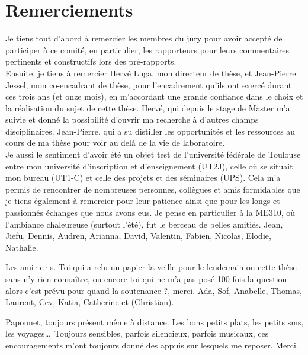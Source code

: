 
\thispagestyle{empty}
\section*{Remerciements}
\adjustmtc

Je tiens tout d'abord à remercier les membres du jury pour avoir accepté de 
participer à ce comité, en particulier, les rapporteurs pour leurs commentaires 
pertinents et constructifs lors des pré-rapports.
\\

Ensuite, je tiens à remercier Hervé Luga, mon directeur de thèse, et Jean-Pierre 
Jessel, mon co-encadrant de thèse, pour l'encadrement qu'ils ont exercé durant 
ces trois ans (et onze mois), en m'accordant une grande confiance dans le choix 
et la réalisation du sujet de cette thèse. 
Hervé, qui depuis le stage de Master m'a suivie et donné la possibilité d'ouvrir 
ma recherche à d'autres champs disciplinaires. Jean-Pierre, qui a su distiller 
les opportunités et les ressources au cours de ma thèse pour voir au delà de la vie 
de laboratoire.
\\

Je aussi le sentiment d'avoir été un objet test de l'université fédérale de Toulouse 
entre mon 
université d'inscription et d'enseignement (UT2J), celle où se situait mon bureau 
(UT1-C) et celle des projets et des séminaires (UPS). Cela m'a permis de 
rencontrer de nombreuses personnes, collègues et amis formidables que je tiens 
également à remercier pour leur patience ainsi que pour les longs et passionnés 
échanges que nous avons eus. Je pense en particulier à la ME310, où l'ambiance 
chaleureuse 
(surtout l'été), fut le berceau de belles amitiés. {\color{white} Jean, Jiefu, 
Dennis, Audren, Arianna, David, Valentin, Fabien, Nicolas, Elodie, Nathalie.}

Les ami·e·s. Toi qui a relu un papier la veille pour le lendemain ou cette 
thèse sans n'y rien connaître, ou encore toi qui ne m'a pas posé 100 fois la 
question \og 
alors c'est 
prévu pour quand la soutenance ?\fg{}, merci. {\color{white} Ada, Sof, Anabelle, 
Thomas, 
Laurent, Cev, Katia, Catherine et (Christian).}

Papounet, toujours présent même à distance. Les bons petits plats, les 
petits sms, les voyages\dots~Toujours sensibles, parfois 
silencieux, parfois musicaux, ces encouragements m'ont toujours donné des 
appuis sur lesquels me reposer. Merci.\\

